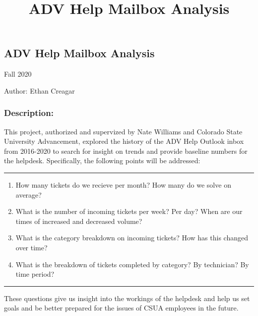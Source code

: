 \documentclass[11pt]{article}
\title{ADV Help Mailbox Analysis}
\begin{document}
    
    \begin{center}
    
    \LARGE
    \hypertarget{adv-help-mailbox-analysis}{%
\section*{ADV Help Mailbox Analysis}\label{adv-help-mailbox-analysis}}

\normalsize
Fall 2020

Author: Ethan Creagar

\end{center}

\tableofcontents

    \hypertarget{description}{%
\subsubsection{Description:}\label{description}}

This project, authorized and supervized by Nate Williams and Colorado
State University Advancement, explored the history of the ADV Help
Outlook inbox from 2016-2020 to search for insight on trends and provide
baseline numbers for the helpdesk. Specifically, the following points
will be addressed:

\begin{center}\rule{0.5\linewidth}{0.5pt}\end{center}

\begin{enumerate}
\def\labelenumi{\arabic{enumi})}
\item
  How many tickets do we recieve per month? How many do we solve on
  average?
\item
  What is the number of incoming tickets per week? Per day? When are our
  times of increased and decreased volume?
\item
  What is the category breakdown on incoming tickets? How has this
  changed over time?
\item
  What is the breakdown of tickets completed by category? By technician?
  By time period?
\end{enumerate}

\begin{center}\rule{0.5\linewidth}{0.5pt}\end{center}

These questions give us insight into the workings of the helpdesk and
help us set goals and be better prepared for the issues of CSUA
employees in the future.
\end{document}
